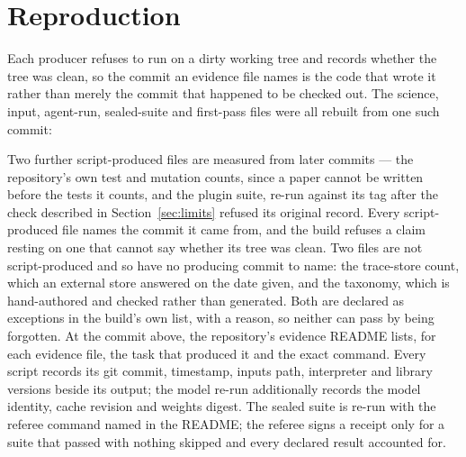 \documentclass[10pt]{article}
\begin{document}


\section{Reproduction}
Each producer refuses to run on a dirty working tree and records whether the tree was clean, so the commit an evidence file names is the code that wrote it rather than merely the commit that happened to be checked out. The science, input, agent-run, sealed-suite and first-pass files were all rebuilt from one such commit:
\begin{center}\small\texttt{\claimevcommit{}}\end{center}
\noindent Two further script-produced files are measured from later commits --- the repository's own test and mutation counts, since a paper cannot be written before the tests it counts, and the plugin suite, re-run against its tag after the check described in Section~\ref{sec:limits} refused its original record. Every script-produced file names the commit it came from, and the build refuses a claim resting on one that cannot say whether its tree was clean. Two files are not script-produced and so have no producing commit to name: the trace-store count, which an external store answered on the date given, and the taxonomy, which is hand-authored and checked rather than generated. Both are declared as exceptions in the build's own list, with a reason, so neither can pass by being forgotten. At the commit above, the repository's evidence README lists, for each evidence file, the task that produced it and the exact command. Every script records its git commit, timestamp, inputs path, interpreter and library versions beside its output; the model re-run additionally records the model identity, cache revision and weights digest. The sealed suite is re-run with the referee command named in the README; the referee signs a receipt only for a suite that passed with nothing skipped and every declared result accounted for.



\end{document}

